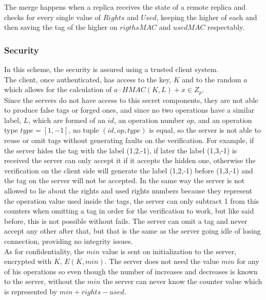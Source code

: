 \documentclass{article}
\begin{document}
The merge happens when a replica receives the state of a remote replica and checks for every single value of $Rights$ and $Used$, keeping the higher of each and then saving the tag of the higher on $rigthsMAC$ and $usedMAC$ respectably.\\

\subsubsection{Security}

In this scheme, the security is assured using a trusted client system.\\

The client, once authenticated, has access to the key, $K$ and to the random $a$ which allows for the calculation of $a \cdot HMAC(K,L) + x \in Z_p$.\\

Since the servers do not have access to this secret components, they are not able to produce false tags or forged ones, and since no two operations have a similar label, $L$, which are formed of an $id$, an operation number $op$, and an operation type $type=[1,-1]$, no tuple $(id,op,type)$ is equal, so the server is not able to reuse or omit tags without generating faults on the verification. For example, if the server hides the tag with the label (1,2,-1), if later the label (1,3,-1) is received the server can only accept it if it accepts the hidden one, otherwise the verification on the client side will generate the label (1,2,-1) before (1,3,-1) and the tag on the server will not be accepted. In the same way the server is not allowed to lie about the rights and used rights numbers because they represent the operation value used inside the tags, the server can only subtract 1 from this counters when omitting a tag in order for the verification to work, but like said before, this is not possible without fails. The server can omit a tag and never accept any other after that, but that is the same as the server going idle of losing connection, providing no integrity issues.\\

As for confidentiality, the $min$ value is sent on initialization to the server, encrypted with $K$, $E(K,min)$. The server does not need the value $min$ for any of his operations so even though the number of increases and decreases is known to the server, without the $min$ the server can never know the counter value which is represented by $min + rights - used$.
\end{document}
